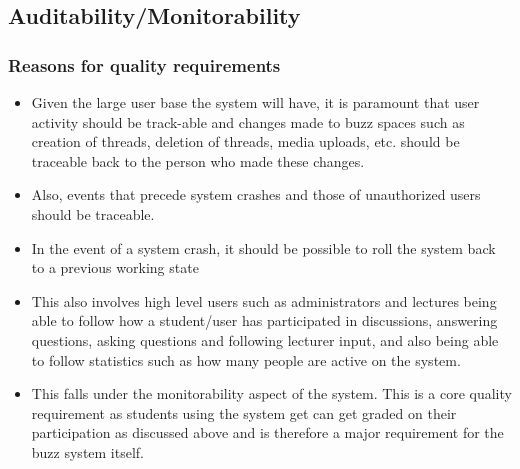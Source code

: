 \documentclass[a4paper,12pt]{report}
\begin{document}
 \subsection{Auditability/Monitorability}
 \subsubsection{Reasons for quality requirements}
 \begin{itemize}
 \item Given the large user base the system will have, it is paramount that user activity should be track-able and changes made to buzz spaces such as creation of threads, deletion of threads, media uploads, etc. should be traceable back to the person who made these changes.
 \item Also, events that precede system crashes and those of unauthorized users should be traceable.
 \item In the event of a system crash, it should be possible to roll the system back to a previous working state
 \item This also involves high level users such as administrators and lectures being able to follow how
a student/user has participated in discussions, answering questions, asking questions and 
following lecturer input, and also being able to follow statistics such as how many people are active on the system.
 \item This falls under the monitorability aspect of the system. This is a
core quality requirement as students using the system get can get graded on their participation
as discussed above and is therefore a major requirement for the buzz system itself.
 \end{itemize}
\end{document}
